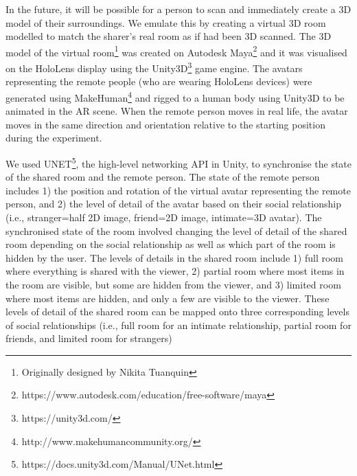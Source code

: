 
In the future, it will be possible for a person to scan and immediately create a 3D model of their surroundings. We emulate this by creating a virtual 3D room modelled to match the sharer's real room as if had been 3D scanned. The 3D model of the virtual room\footnote{Originally designed by Nikita Tuanquin} was created on Autodesk Maya\footnote{https://www.autodesk.com/education/free-software/maya} and it was visualised on the HoloLens display using the Unity3D\footnote{https://unity3d.com/} game engine. The avatars representing the remote people (who are wearing HoloLens devices) were generated using MakeHuman\footnote{http://www.makehumancommunity.org/} and rigged to a human body using Unity3D to be animated in the AR scene. When the remote person moves in real life, the avatar moves in the same direction and orientation relative to the starting position during the experiment. 


We used UNET\footnote{https://docs.unity3d.com/Manual/UNet.html}, the high-level networking API in Unity, to synchronise the state of the shared room and the remote person. The state of the remote person includes 1) the position and rotation of the virtual avatar representing the remote person, and 2) the level of detail of the avatar based on their social relationship (i.e., stranger=half 2D image, friend=2D image, intimate=3D avatar). The synchronised state of the room involved changing the level of detail of the shared room depending on the social relationship as well as which part of the room is hidden by the user. The levels of details in the shared room include 1) full room where everything is shared with the viewer, 2) partial room where most items in the room are visible, but some are hidden from the viewer, and 3) limited room where most items are hidden, and only a few are visible to the viewer. These levels of detail of the shared room can be mapped onto three corresponding levels of social relationships (i.e., full room for an intimate relationship, partial room for friends, and limited room for strangers)

